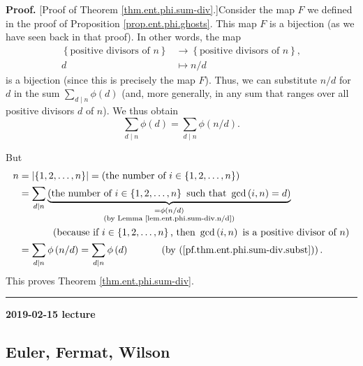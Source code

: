 \documentclass[numbers=enddot,12pt,final,onecolumn,notitlepage]{scrartcl}%
\numberwithin{exer}{subsection}
\theoremstyle{definition}
\newenvironment{proof}[1][Proof]{\noindent\textbf{#1.} }{\ \rule{0.5em}{0.5em}}
\let\sumnonlimits\sum
\renewcommand{\sum}{\sumnonlimits\limits}
\begin{document}
\begin{proof}
[Proof of Theorem \ref{thm.ent.phi.sum-div}.]Consider the map $F$ we defined
in the proof of Proposition \ref{prop.ent.phi.ghosts}. This map $F$ is a
bijection (as we have seen back in that proof). In other words, the map%
\begin{align*}
\left\{  \text{positive divisors of }n\right\}   &  \rightarrow\left\{
\text{positive divisors of }n\right\}  ,\\
d  &  \mapsto n/d
\end{align*}
is a bijection (since this is precisely the map $F$). Thus, we can substitute
$n/d$ for $d$ in the sum $\sum_{d\mid n}\phi\left(  d\right)  $ (and, more
generally, in any sum that ranges over all positive divisors $d$ of $n$). We
thus obtain%
\begin{equation}
\sum_{d\mid n}\phi\left(  d\right)  =\sum_{d\mid n}\phi\left(  n/d\right)  .
\label{pf.thm.ent.phi.sum-div.subst}%
\end{equation}


But%
\begin{align*}
n  &  =\left\vert \left\{  1,2,\ldots,n\right\}  \right\vert =\left(
\text{the number of }i\in\left\{  1,2,\ldots,n\right\}  \right) \\
&  =\sum_{d\mid n}\underbrace{\left(  \text{the number of }i\in\left\{
1,2,\ldots,n\right\}  \text{ such that }\gcd\left(  i,n\right)  =d\right)
}_{\substack{=\phi\left(  n/d\right)  \\\text{(by Lemma
\ref{lem.ent.phi.sum-div.n/d})}}}\\
&  \ \ \ \ \ \ \ \ \ \ \left(  \text{because if }i\in\left\{  1,2,\ldots
,n\right\}  \text{, then }\gcd\left(  i,n\right)  \text{ is a positive divisor
of }n\right) \\
&  =\sum_{d\mid n}\phi\left(  n/d\right)  =\sum_{d\mid n}\phi\left(  d\right)
\ \ \ \ \ \ \ \ \ \ \left(  \text{by (\ref{pf.thm.ent.phi.sum-div.subst}%
)}\right)  .
\end{align*}
This proves Theorem \ref{thm.ent.phi.sum-div}.
\end{proof}

\begin{center}
\textbf{2019-02-15 lecture}
\end{center}

\subsection{Euler, Fermat, Wilson}
\end{document}
